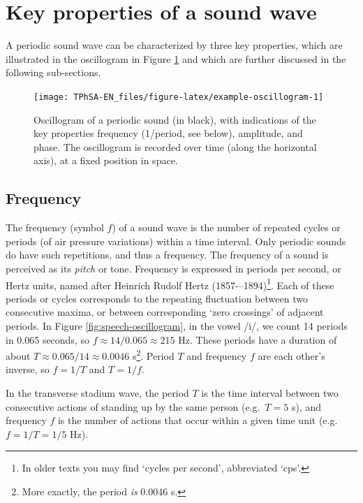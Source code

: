 \documentclass[
]{book}
\begin{document}
\section{Key properties of a sound wave}\label{sec:keypropertiessound}

A periodic sound wave can be characterized by three key properties, which are illustrated in the oscillogram in Figure \ref{fig:example-oscillogram} and which are further discussed in the following sub-sections.

\begin{figure}

{\centering \texttt{[image: TPhSA-EN\_files/figure-latex/example-oscillogram-1]} 

}

\caption{Oscillogram of a periodic sound (in black), with indications of the key properties frequency (1/period, see below), amplitude, and phase. The oscillogram is recorded over time (along the horizontal axis), at a fixed position in space.}\label{fig:example-oscillogram}
\end{figure}

\subsection{Frequency}\label{sec:frequency}

The frequency (symbol \(f\)) of a sound wave is the number of repeated cycles or periods (of air pressure variations) within a time interval. Only periodic sounds do have such repetitions, and thus a frequency. The frequency of a sound is perceived as its \emph{pitch} or tone. Frequency is expressed in periods per second, or Hertz units, named after Heinrich Rudolf Hertz (1857-\/--1894)\footnote{In older texts you may find `cycles per second', abbreviated `cps'.}.
Each of these periods or cycles corresponds to the repeating fluctuation between two consecutive maxima, or between corresponding `zero crossings' of adjacent periods. In Figure \ref{fig:speech-oscillogram}, in the vowel /i/, we count 14 periods in 0.065 seconds, so \(f \approx 14/0.065 \approx 215\) Hz. These periods have a duration of about \(T \approx 0.065/14 \approx 0.0046\) s\footnote{More exactly, the period \emph{is} 0.0046 s.}. Period \(T\) and frequency \(f\) are each other's inverse, so \(f=1/T\) and \(T=1/f\).

In the transverse stadium wave, the period \(T\) is the time interval between two consecutive actions of standing up by the same person (e.g.~\(T=5\) s), and frequency \(f\) is the number of actions that occur within a given time unit (e.g.~\(f=1/T=1/5\) Hz).
\end{document}

